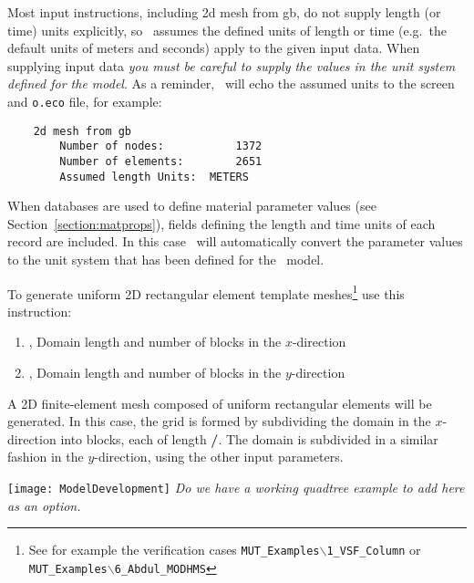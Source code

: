 Most input instructions, including \textsf{2d mesh from gb}, do not supply length (or time) units explicitly, so \mut\ assumes the defined units of length or time (e.g.\ the default units of meters and seconds) apply to the given input data. When supplying input data {\em you must be careful to supply the values in the unit system defined for the model}.  As a reminder, \mut\ will echo the assumed units to the screen and \texttt{o.eco} file, for example: 
\begin{verbatim}
    2d mesh from gb
    	Number of nodes:           1372
    	Number of elements:        2651
    	Assumed length Units:  METERS
\end{verbatim}

When databases are used to define material parameter values (see Section~\ref{section:matprops}), fields defining the length and time units of each record are included. In this case \mut\ will automatically convert the parameter values to the unit system that has been defined for the \mfus\ model.

\pagebreak
To generate uniform 2D rectangular element template meshes\footnote{See for example the verification cases \texttt{MUT\_Examples$\backslash$1\_VSF\_Column} or \texttt{MUT\_Examples$\backslash$6\_Abdul\_MODHMS}} use this instruction:

    {
    \squish
    \begin{enumerate}
    \item {},   Domain length and number of blocks in the $x$-direction
    \item {},   Domain length and number of blocks in the $y$-direction
    \end{enumerate}
    A 2D finite-element mesh composed of uniform rectangular elements will be generated. In this case, the
    grid is formed by subdividing the domain in the $x$-direction into  blocks, each of length
    \textbf{/}. The domain is subdivided in a similar fashion in the $y$-direction, using the other input parameters.
    }

\texttt{[image: ModelDevelopment]} \textit{Do we have a working quadtree example to add here as an option.}
%
%

